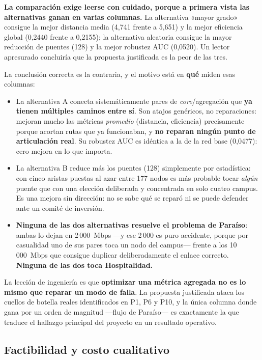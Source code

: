 \documentclass[10pt,a4paper]{extarticle}
\begin{document}
\textbf{La comparación exige leerse con cuidado, porque a primera vista las alternativas
ganan en varias columnas.} La alternativa «mayor grado» consigue la mejor distancia media
(4,741 frente a 5,651) y la mejor eficiencia global (0,2440 frente a 0,2155); la alternativa
aleatoria consigue la mayor reducción de puentes (128) y la mejor robustez AUC (0,0520). Un
lector apresurado concluiría que la propuesta justificada es la peor de las tres.

La conclusión correcta es la contraria, y el motivo está en \textbf{qué} miden esas columnas:

\begin{itemize}[leftmargin=*,itemsep=1.5mm]
\item La alternativa A conecta sistemáticamente pares de \textit{core}/agregación que
\textbf{ya tienen múltiples caminos entre sí}. Son atajos genéricos, no reparaciones: mejoran
mucho las métricas \textit{promedio} (distancia, eficiencia) precisamente porque acortan
rutas que ya funcionaban, y \textbf{no reparan ningún punto de articulación real}. Su
robustez AUC es idéntica a la de la red base (0,0477): cero mejora en lo que importa.

\item La alternativa B reduce más los puentes (128) simplemente por estadística: con cinco
aristas puestas al azar entre 177 nodos es más probable tocar \textit{algún} puente que con
una elección deliberada y concentrada en solo cuatro campus. Es una mejora sin dirección: no
se sabe qué se reparó ni se puede defender ante un comité de inversión.

\item \textbf{Ninguna de las dos alternativas resuelve el problema de Paraíso}: ambas lo
dejan en 2\,000~Mbps ---y ese 2\,000 es puro accidente, porque por casualidad uno de sus
pares toca un nodo del campus--- frente a los 10\,000~Mbps que consigue duplicar
deliberadamente el enlace correcto. \textbf{Ninguna de las dos toca Hospitalidad.}
\end{itemize}

La lección de ingeniería es que \textbf{optimizar una métrica agregada no es lo mismo que
reparar un modo de falla}. La propuesta justificada ataca los cuellos de botella reales
identificados en P1, P6 y P10, y la única columna donde gana por un orden de magnitud
---flujo de Paraíso--- es exactamente la que traduce el hallazgo principal del proyecto en
un resultado operativo.

\subsection{Factibilidad y costo cualitativo}
\end{document}
